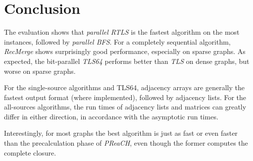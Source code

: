 \documentclass[12pt,a4paper,twoside]{article}
\begin{document}


\section{Conclusion}

The evaluation shows that \emph{parallel RTLS} is the fastest algorithm on the most instances, followed by \emph{parallel BFS}. For a completely sequential algorithm, \emph{RecMerge} shows surprisingly good performance, especially on sparse graphs.  As expected, the bit-parallel \emph{TLS64} performs better than \emph{TLS} on dense graphs, but worse on sparse graphs.

For the single-source algorithms and TLS64, adjacency arrays are generally the fastest output format (where implemented), followed by adjacency lists. For the all-sources algorithms, the run times of adjacency lists and matrices can greatly differ in either direction, in accordance with the asymptotic run times.

Interestingly, for most graphs the best algorithm is just as fast or even faster than the precalculation phase of \emph{PReaCH}, even though the former computes the complete closure.




\end{document}
